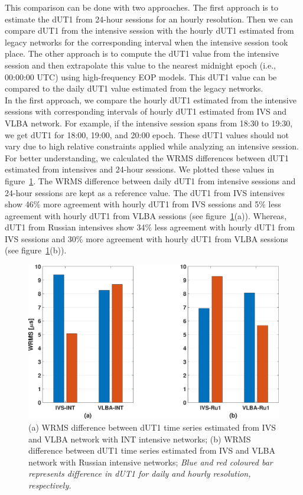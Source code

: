 \documentclass[smallextended]{svjour3}       %
\begin{document}
This comparison can be done with two approaches. The first approach is to estimate the dUT1 from 24-hour sessions for an hourly resolution. Then we can compare dUT1 from the intensive session with the hourly dUT1 estimated from legacy networks for the corresponding interval when the intensive session took place. The other approach is to compute the dUT1 value from the intensive session and then extrapolate this value to the nearest midnight epoch (i.e., 00:00:00 UTC) using high-frequency EOP models. This dUT1 value can be compared to the daily dUT1 value estimated from the legacy networks. \\
In the first approach, we compare the hourly dUT1 estimated from the intensive sessions with corresponding intervals of hourly dUT1 estimated from IVS and VLBA network. For example, if the intensive session spans from 18:30 to 19:30, we get dUT1 for 18:00, 19:00, and 20:00 epoch. These dUT1 values should not vary due to high relative constraints applied while analyzing an intensive session. For better understanding, we calculated the WRMS differences between dUT1 estimated from intensives and 24-hour sessions. We plotted these values in figure~\ref{fig:wrmsdut1}.
The WRMS difference between daily dUT1 from intensive sessions and 24-hour sessions are kept as a reference value.
The dUT1 from IVS intensives show 46$\%$ more agreement with hourly dUT1 from IVS sessions and 5$\%$ less agreement with hourly dUT1 from VLBA sessions (see figure~\ref{fig:wrmsdut1}(a)). Whereas, dUT1 from Russian intensives show 34$\%$ less agreement with hourly dUT1 from IVS sessions and 30$\%$ more agreement with hourly dUT1 from VLBA sessions (see figure~\ref{fig:wrmsdut1}(b)). 
\begin{figure}[h]
    \centering
    \includegraphics[scale=0.25]{wrmsdut1.eps}
    \caption{(a) WRMS difference between dUT1 time series estimated from IVS and VLBA network with INT intensive networks; (b) WRMS difference between dUT1 time series estimated from IVS and VLBA network with Russian intensive networks; \textit{Blue and red coloured bar represents difference in dUT1 for daily and hourly resolution, respectively.}
   }
    \label{fig:wrmsdut1}
\end{figure}
\end{document}
